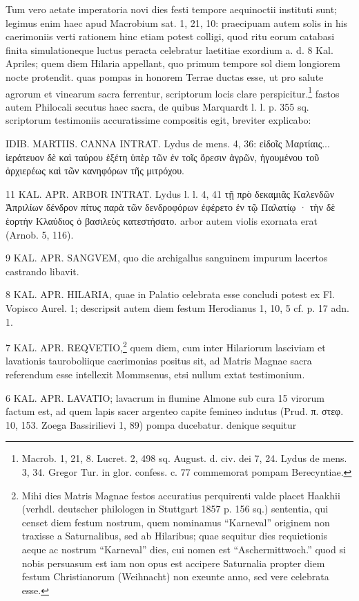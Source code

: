 \documentclass[a4paper, 11pt, oneside, polutonikogreek, german]{article}
\begin{document}
Tum vero aetate imperatoria novi dies festi tempore aequinoctii instituti sunt; legimus enim haec apud Macrobium sat. 1, 21, 10: praecipuam autem solis in his caerimoniis verti rationem hinc etiam potest colligi, quod ritu eorum catabasi finita simulationeque luctus peracta celebratur laetitiae exordium a. d. 8 Kal. Apriles; quem diem Hilaria appellant, quo primum tempore sol diem longiorem nocte protendit. quas pompas in honorem Terrae ductas esse, ut pro salute agrorum et vinearum sacra ferrentur, scriptorum locis clare perspicitur.\footnote{Macrob. 1, 21, 8. Lucret. 2, 498 sq. August. d. civ. dei 7, 24. Lydus de mens. 3, 34. Gregor Tur. in glor. confess. c. 77 commemorat pompam Berecyntiae.} fastos autem Philocali secutus haec sacra, de quibus Marquardt l. l. p. 355 sq. scriptorum testimoniis accuratissime compositis egit, breviter explicabo:

IDIB. MARTIIS. CANNA INTRAT. Lydus de mens. 4, 36: εἰδοῖς Μαρτίαις... ἱεράτευον δὲ καὶ ταύρου ἑξέτη ὑπὲρ τῶν ἐν τοῖς ὄρεσιν ἀγρῶν, ἡγουμένου τοῦ ἀρχιερέως καὶ τῶν κανηφόρων τῆς μιτρόχου.

11 KAL. APR. ARBOR INTRAT. Lydus l. l. 4, 41 τῇ πρὸ δεκαμιᾶς Καλενδῶν Ἀπριλίων δένδρον πίτυς παρὰ τῶν δενδροφόρων ἐφέρετο ἐν τῷ Παλατίῳ · τὴν δὲ ἑορτὴν Κλαύδιος ὁ βασιλεὺς κατεστήσατο. arbor autem violis exornata erat (Arnob. 5, 116).

9 KAL. APR. SANGVEM, quo die archigallus sanguinem impurum lacertos castrando libavit.

8 KAL. APR. HILARIA, quae in Palatio celebrata esse concludi potest ex Fl. Vopisco Aurel. 1; descripsit autem diem festum Herodianus 1, 10, 5 cf. p. 17 adn. 1.

7 KAL. APR. REQVETIO,\footnote{Mihi dies Matris Magnae festos accuratius perquirenti valde placet Haakhii (verhdl. deutscher philologen in Stuttgart 1857 p. 156 sq.) sententia, qui censet diem festum nostrum, quem nominamus "`Karneval"' originem non traxisse a Saturnalibus, sed ab Hilaribus; quae sequitur dies requietionis aeque ac nostrum "`Karneval"' dies, cui nomen est "`Aschermittwoch."' quod si nobis persuasum est iam non opus est accipere Saturnalia propter diem festum Christianorum (Weihnacht) non exeunte anno, sed vere celebrata esse.} quem diem, cum inter Hilariorum lasciviam et lavationis tauroboliique caerimonias positus sit, ad Matris Magnae sacra referendum esse intellexit Mommsenus, etsi nullum extat testimonium.

6 KAL. APR. LAVATIO; lavacrum in flumine Almone sub cura 15 virorum factum est, ad quem lapis sacer argenteo capite femineo indutus (Prud. π. στεφ. 10, 153. Zoega Bassirilievi 1, 89) pompa ducebatur. denique sequitur
\end{document}
